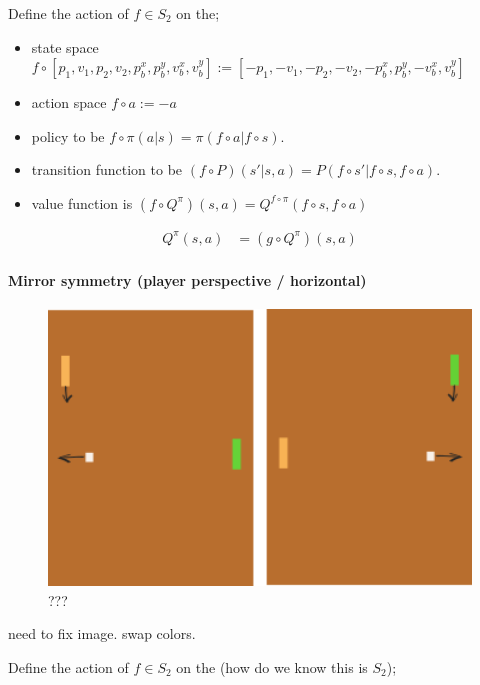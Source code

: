 Define the action of $f \in S_2$ on the;

\begin{itemize}
	\tightlist
	\item state space $f \circ [p_1, v_1, p_2, v_2, p^x_b, p^y_b, v^x_b, v^y_b] := [-p_1, -v_1, -p_2, -v_2, -p^x_b, p^y_b, -v^x_b, v^y_b]$
	\item action space $f \circ a := -a$
 	\item policy to be $f \circ \pi(a | s) = \pi(f \circ a | f \circ s)$.
	\item transition function to be $(f \circ P)(s' | s, a) = P(f \circ s'| f \circ s, f \circ a)$.
	\item value function is $(f \circ Q^{\pi})(s, a) = Q^{f \circ \pi}(f \circ s, f \circ a)$
\end{itemize}

\begin{align*}
Q^\pi(s, a) &= (g \circ Q^{\pi})(s, a) \tag{expected return}
\end{align*}


\paragraph{Mirror symmetry (player perspective / horizontal)}

\begin{figure}
\centering
\includegraphics[width=1\textwidth,height=0.25\textheight]{../../pictures/drawings/pong-horz-flip.png}
\caption{???}
\end{figure}

{\color{red}need to fix image. swap colors.}

Define the action of $f \in S_2$ on the {\color{red}(how do we know this is $S_2$)};

